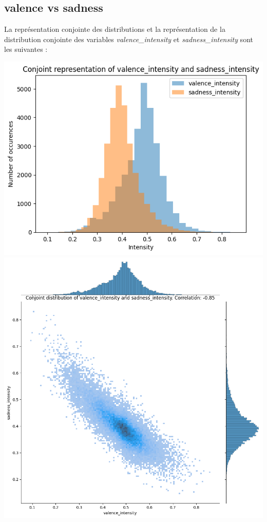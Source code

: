 \documentclass{article}
\begin{document}
\subsection*{valence vs sadness}

La représentation conjointe des distributions et la représentation de la
distribution conjointe des variables
\textit{valence\_intensity} et \textit{sadness\_intensity}
sont les suivantes :

\begin{center}
    \includegraphics[scale=0.39]{./img/conjoint_representation_valence_intensity_sadness_intensity.png}
    \includegraphics[scale=0.23]{./img/conjoint_distribution_valence_intensity_sadness_intensity.png}
\end{center}
\end{document}
